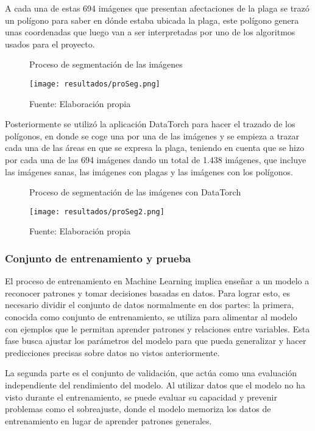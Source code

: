 A cada una de estas 694 imágenes que presentan afectaciones de la plaga se trazó un polígono para saber en dónde estaba ubicada la plaga, este polígono genera unas coordenadas que luego van a ser interpretadas por uno de los algoritmos usados para el proyecto.

\newpage

\begin{figure}[h]
\centering
\caption{Proceso de segmentación de las imágenes}
\texttt{[image: resultados/proSeg.png]}
\caption*{\footnotesize Fuente: Elaboración propia}
\label{fig:figuraProSeg}
\end{figure}

Posteriormente se utilizó la aplicación DataTorch para hacer el trazado de los polígonos, en donde se coge una por una de las imágenes y se empieza a trazar cada una de las áreas en que se expresa la plaga, teniendo en cuenta que se hizo por cada una de las 694 imágenes dando un total de 1.438 imágenes, que incluye las imágenes sanas, las imágenes con plagas y las imágenes con los polígonos.

\begin{figure}[h]
\centering
\caption{Proceso de segmentación de las imágenes con DataTorch}
\texttt{[image: resultados/proSeg2.png]}
\caption*{\footnotesize Fuente: Elaboración propia}
\label{fig:figuraProSegDatatorch}
\end{figure}

\subsubsection{Conjunto de entrenamiento y prueba}

El proceso de entrenamiento en Machine Learning implica enseñar a un modelo a reconocer patrones y tomar decisiones basadas en datos. Para lograr esto, es necesario dividir el conjunto de datos normalmente en dos partes: la primera, conocida como conjunto de entrenamiento, se utiliza para alimentar al modelo con ejemplos que le permitan aprender patrones y relaciones entre variables. Esta fase busca ajustar los parámetros del modelo para que pueda generalizar y hacer predicciones precisas sobre datos no vistos anteriormente.

\newpage

La segunda parte es el conjunto de validación, que actúa como una evaluación independiente del rendimiento del modelo. Al utilizar datos que el modelo no ha visto durante el entrenamiento, se puede evaluar su capacidad y prevenir problemas como el sobreajuste, donde el modelo memoriza los datos de entrenamiento en lugar de aprender patrones generales.

